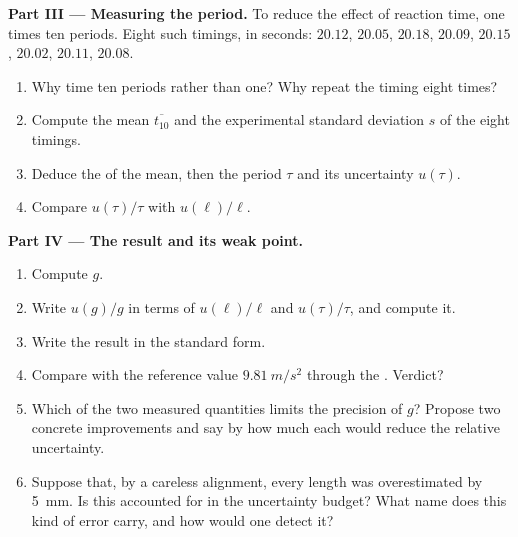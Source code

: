 \begin{problem}
\medskip
\noindent\textbf{Part III --- Measuring the period.}
To reduce the effect of reaction time, one times ten periods. Eight
such timings, in seconds: $20.12$, $20.05$, $20.18$, $20.09$, $20.15$,
$20.02$, $20.11$, $20.08$.
\begin{enumerate}[resume]
  \item Why time ten periods rather than one? Why repeat the timing
        eight times?
  \item Compute the mean $\overline{t_{10}}$ and the experimental
        standard deviation $s$ of the eight timings.
  \item Deduce the  of the mean, then the period
        $\tau$ and its uncertainty $u(\tau)$.
  \item Compare $u(\tau)/\tau$ with $u(\ell)/\ell$.
\end{enumerate}

\medskip
\noindent\textbf{Part IV --- The result and its weak point.}
\begin{enumerate}[resume]
  \item Compute $g$.
  \item Write $u(g)/g$ in terms of $u(\ell)/\ell$ and $u(\tau)/\tau$,
        and compute it.
  \item Write the result in the standard form.
  \item Compare with the reference value $\qty{9.81}{m/s^2}$ through
        the . Verdict?
  \item Which of the two measured quantities limits the precision of
        $g$? Propose two concrete improvements and say by how much each
        would reduce the relative uncertainty.
  \item Suppose that, by a careless alignment, every length was
        overestimated by \qty{5}{mm}. Is this accounted for in the
        uncertainty budget? What name does this kind of error carry,
        and how would one detect it?
\end{enumerate}


\end{problem}
